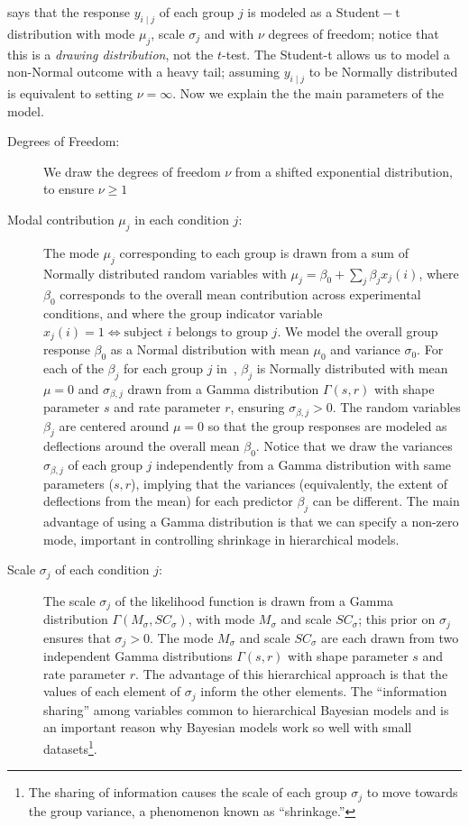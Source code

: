 says that the response $y_{i \mid j}$ of each group $j$ is modeled as a $\mathrm{Student-t}$ distribution with mode $\mu_j$,  scale $\sigma_j$ and with $\nu$ degrees of freedom; notice that this is a \textit{drawing distribution}, not the $t$-test. The Student-t allows us to model a non-Normal outcome with a heavy tail; assuming $y_{i \mid j}$ to be Normally distributed is equivalent to setting $\nu=\infty$. Now we explain the the main parameters of the model.


\begin{description}
    \item[Degrees of Freedom:] We draw the degrees of freedom $\nu$ from a shifted exponential distribution, to ensure $\nu \geq 1$
    \item[Modal contribution $\mu_j$ in each condition $j$:] The mode $\mu_j$ corresponding to each group is drawn from a sum of Normally distributed random variables with $\mu_j = \beta_0 + \sum_j \beta_j x_j(i)$, where $\beta_0$ corresponds to the overall mean contribution across experimental conditions, and where the group indicator variable $x_j(i)=1 \iff \text{subject } i \text{ belongs to group } j$. We model the overall group response $\beta_0$ as a Normal distribution with mean $\mu_0$ and variance $\sigma_0$. For each of the $\beta_j$ for each group $j$ in~, $\beta_j$ is Normally distributed with mean $\mu=0$ and $\sigma_{\beta, j}$ drawn from a Gamma distribution $\Gamma(s,r)$ with shape parameter $s$ and rate parameter $r$, ensuring $\sigma_{\beta, j} > 0$. 
    The random variables $\beta_j$ are centered around $\mu=0$ so that the group responses are modeled as deflections around the overall mean $\beta_0$. Notice that we draw the variances $\sigma_{\beta, j}$ of each group $j$ independently from a Gamma distribution with same parameters ($s,r$), implying that the variances (equivalently, the extent of deflections from the mean) for each predictor $\beta_j$ can be different. The main advantage of using a Gamma distribution is that we can specify a non-zero mode, important in controlling shrinkage in hierarchical models. 
    \item[Scale $\sigma_j$ of each condition $j$:]  The scale $\sigma_j$ of the likelihood function is drawn from a Gamma distribution $\Gamma(M_{\sigma}, SC_{\sigma})$, with mode $M_{\sigma}$ and scale $SC_{\sigma}$; this prior on $\sigma_j$ ensures that $\sigma_j > 0$. The mode $M_{\sigma}$ and scale $SC_{\sigma}$ are each drawn from two independent Gamma distributions $\Gamma(s,r)$ with shape parameter $s$ and rate parameter $r$. The advantage of this hierarchical approach is that the values of each element of $\sigma_j$ inform the other elements. The ``information sharing'' among variables common to hierarchical Bayesian models and is an important reason why Bayesian models work so well with small datasets\footnote{The sharing of information causes the scale of each group $\sigma_{j}$ to move towards the group variance, a phenomenon known as ``shrinkage.'' }.

\end{description}
